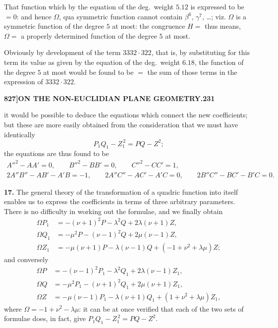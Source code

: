 \documentclass[11pt,a4paper]{book}
\begin{document}
\begin{art}
That function which by the equation of the deg.~weight $5.12$ is expressed to be $=0$: and hence $\Omega$, qua symmetric function cannot contain $\beta^6$, $\gamma^7$, \ldots; viz. $\Omega$ is a symmetric function of the degree $5$ at most: the congruence $H = $ thus means, $\Omega = $ a properly determined function of the degree $5$ at most.

Obviously by development of the term $3332 \cdot 322$, that is, by substituting for this term its value as given by the equation of the deg.~weight $6.18$, the function of the degree $5$ at most would be found to be $=$ the sum of those terms in the expression of $3332 \cdot 322$.
\end{art}
\clearpage


\setcounter{page}{231}


\noindent\textbf{827]\quad ON THE NON-EUCLIDIAN PLANE GEOMETRY.}\hfill\textbf{231}

\bigskip

\noindent it would be possible to deduce the equations which connect the new coefficients; but these are more easily obtained from the consideration that we must have identically
\[
P_1 Q_1 - Z_1^{\,2} = PQ - Z^2;
\]
the equations are thus found to be
\begin{gather*}
A''^{2} - AA' = 0, \qquad B''^{2} - BB' = 0, \qquad C''^{2} - CC' = 1, \\
2A''B'' - AB' - A'B = -1, \qquad 2A''C'' - AC' - A'C = 0, \qquad 2B''C'' - BC' - B'C = 0.
\end{gather*}

\medskip

\noindent\textbf{17.} The general theory of the transformation of a quadric function into itself enables us to express the coefficients in terms of three arbitrary parameters. There is no difficulty in working out the formulae, and we finally obtain
\begin{align*}
\Omega P_1 &= -(\nu+1)^2 P - \lambda^2 Q + 2\lambda(\nu+1)Z, \\
\Omega Q_1 &= -\mu^2 P - (\nu-1)^2 Q + 2\mu(\nu-1)Z, \\
\Omega Z_1 &= -\mu(\nu+1)P - \lambda(\nu-1)Q + (-1 + \nu^2 + \lambda\mu)Z;
\end{align*}
and conversely
\begin{align*}
\Omega P &= -(\nu-1)^2 P_1 - \lambda^2 Q_1 + 2\lambda(\nu-1)Z_1, \\
\Omega Q &= -\mu^2 P_1 - (\nu+1)^2 Q_1 + 2\mu(\nu+1)Z_1, \\
\Omega Z &= -\mu(\nu-1)P_1 - \lambda(\nu+1)Q_1 + (1 + \nu^2 + \lambda\mu)Z_1,
\end{align*}
where $\Omega = -1 + \nu^2 - \lambda\mu$: it can be at once verified that each of the two sets of formulae does, in fact, give $P_1 Q_1 - Z_1^{\,2} = PQ - Z^2$.
\end{document}
